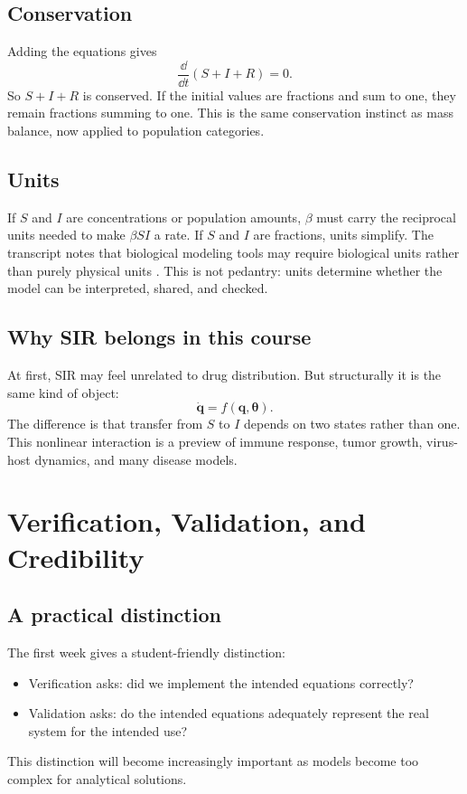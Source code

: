 \documentclass[a4paper]{article}
\newcommand{\ddt}{\frac{\dd}{\dd t}}
\newcommand{\vect}[1]{\boldsymbol{#1}}
\begin{document}
\subsection{Conservation}

Adding the equations gives
\[
  \ddt(S+I+R)=0.
\]
So \(S+I+R\) is conserved. If the initial values are fractions and sum to one, they remain fractions summing to one. This is the same conservation instinct as mass balance, now applied to population categories.

\subsection{Units}

If \(S\) and \(I\) are concentrations or population amounts, \(\beta\) must carry the reciprocal units needed to make \(\beta SI\) a rate. If \(S\) and \(I\) are fractions, units simplify. The transcript notes that biological modeling tools may require biological units rather than purely physical units \cite{bmeg671TranscriptSep032025}. This is not pedantry: units determine whether the model can be interpreted, shared, and checked.

\subsection{Why SIR belongs in this course}

At first, SIR may feel unrelated to drug distribution. But structurally it is the same kind of object:
\[
  \dot{\vect q}=f(\vect q,\vect\theta).
\]
The difference is that transfer from \(S\) to \(I\) depends on two states rather than one. This nonlinear interaction is a preview of immune response, tumor growth, virus-host dynamics, and many disease models.

\section{Verification, Validation, and Credibility}

\subsection{A practical distinction}

The first week gives a student-friendly distinction:
\begin{itemize}[leftmargin=2em]
  \item Verification asks: did we implement the intended equations correctly?
  \item Validation asks: do the intended equations adequately represent the real system for the intended use?
\end{itemize}
This distinction will become increasingly important as models become too complex for analytical solutions.
\end{document}
